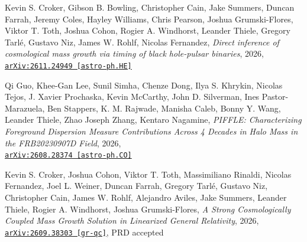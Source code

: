 \begin{minipage}{\textwidth}
Kevin S. Croker, Gibson B. Bowling, Christopher Cain, Jake Summers, Duncan Farrah, Jeremy Coles, Hayley Williams, Chris Pearson, Joshua Grumski-Flores, Viktor T. Toth, Joshua Cohon, Rogier A. Windhorst, Leander Thiele, Gregory Tarl\'e, Gustavo Niz, James W. Rohlf, Nicolas Fernandez,
\emph{Direct inference of cosmological mass growth via timing of black hole-pulsar binaries}, 2026,\\
\href{https://arxiv.org/abs/2611.24949}{\mbox{\texttt{arXiv:2611.24949 [astro-ph.HE]}}}
\end{minipage}

\begin{minipage}{\textwidth}
Qi Guo, Khee-Gan Lee, Sunil Simha, Chenze Dong, Ilya S. Khrykin, Nicolas Tejos, J. Xavier Prochaska, Kevin McCarthy, John D. Silverman, Ines Pastor-Marazuela, Ben Stappers, K. M. Rajwade, Manisha Caleb, Bonny Y. Wang, Leander Thiele, Zhao Joseph Zhang, Kentaro Nagamine,
\emph{PIFFLE: Characterizing Foreground Dispersion Measure Contributions Across 4 Decades in Halo Mass in the FRB20230907D Field}, 2026,\\
\href{https://arxiv.org/abs/2608.28374}{\mbox{\texttt{arXiv:2608.28374 [astro-ph.CO]}}}
\end{minipage}

\begin{minipage}{\textwidth}
Kevin S. Croker, Joshua Cohon, Viktor T. Toth, Massimiliano Rinaldi, Nicolas Fernandez, Joel L. Weiner, Duncan Farrah, Gregory Tarl\'e, Gustavo Niz, Christopher Cain, James W. Rohlf, Alejandro Aviles, Jake Summers, Leander Thiele, Rogier A. Windhorst, Joshua Grumski-Flores,
\emph{A Strong Cosmologically Coupled Mass Growth Solution in Linearized General Relativity}, 2026,\\
\href{https://arxiv.org/abs/2609.38303}{\mbox{\texttt{arXiv:2609.38303 [gr-qc]}}}, PRD accepted
\end{minipage}

